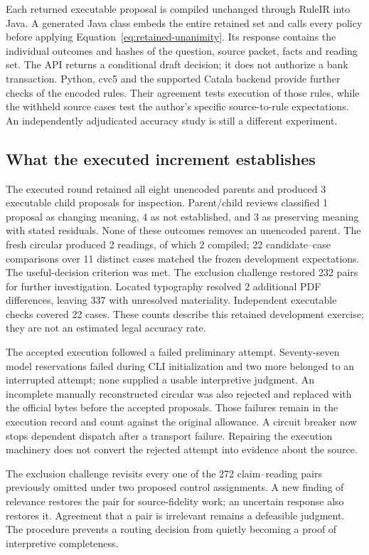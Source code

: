 Each returned executable proposal is compiled unchanged through RuleIR into
Java. A generated Java class embeds the entire retained set and calls every
policy before applying Equation~\eqref{eq:retained-unanimity}. Its response
contains the individual outcomes and hashes of the question, source packet,
facts and reading set. The API returns a conditional draft decision; it does
not authorize a bank transaction. Python, cvc5 and the supported Catala backend
provide further checks of the encoded rules. Their agreement tests execution
of those rules, while the withheld source cases test the author's specific
source-to-rule expectations. An independently adjudicated accuracy study is
still a different experiment.

\subsection{What the executed increment establishes}

The executed round retained all eight unencoded parents and produced 3 executable child proposals for inspection. Parent/child reviews classified 1 proposal as changing meaning, 4 as not established, and 3 as preserving meaning with stated residuals. None of these outcomes removes an unencoded parent. The fresh circular produced 2 readings, of which 2 compiled; 22 candidate--case comparisons over 11 distinct cases matched the frozen development expectations. The useful-decision criterion was met. The exclusion challenge restored 232 pairs for further investigation. Located typography resolved 2 additional PDF differences, leaving 337 with unresolved materiality. Independent executable checks covered 22 cases. These counts describe this retained development exercise; they are not an estimated legal accuracy rate.

The accepted execution followed a failed preliminary attempt. Seventy-seven
model reservations failed during CLI initialization and two more belonged to
an interrupted attempt; none supplied a usable interpretive judgment. An
incomplete manually reconstructed circular was also rejected and replaced with
the official bytes before the accepted proposals. Those failures remain in the
execution record and count against the original allowance. A circuit breaker
now stops dependent dispatch after a transport failure. Repairing the execution
machinery does not convert the rejected attempt into evidence about the source.

The exclusion challenge revisits every one of the 272 claim--reading pairs
previously omitted under two proposed control assignments. A new finding of
relevance restores the pair for source-fidelity work; an uncertain response
also restores it. Agreement that a pair is irrelevant remains a defeasible
judgment. The procedure prevents a routing decision from quietly becoming a
proof of interpretive completeness.

